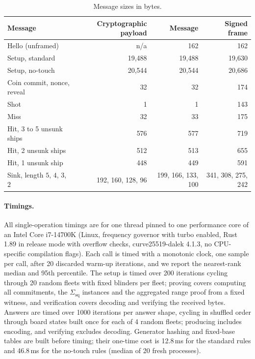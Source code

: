 \documentclass[11pt]{article}
\theoremstyle{definition}
\theoremstyle{remark}
\newcommand{\Sq}{\Sigma_{\mathrm{sq}}}
\begin{document}
\begin{table}[t]
\centering
\begin{tabular}{@{}lrrr@{}}
\toprule
Message & Cryptographic payload & Message & Signed frame\\
\midrule
Hello (unframed) & n/a & 162 & 162\\
Setup, standard & 19,488 & 19,488 & 19,630\\
Setup, no-touch & 20,544 & 20,544 & 20,686\\
Coin commit, nonce, reveal & 32 & 32 & 174\\
Shot & 1 & 1 & 143\\
Miss & 32 & 33 & 175\\
Hit, 3 to 5 unsunk ships & 576 & 577 & 719\\
Hit, 2 unsunk ships & 512 & 513 & 655\\
Hit, 1 unsunk ship & 448 & 449 & 591\\
Sink, length $5$, $4$, $3$, $2$ & 192, 160, 128, 96 & 199, 166, 133, 100 & 341, 308, 275, 242\\
\bottomrule
\end{tabular}
\caption{Message sizes in bytes.}
\label{tab:sizes}
\end{table}

\paragraph{Timings.}
All single-operation timings are for one thread pinned to one performance core of an Intel Core i7-14700K (Linux, frequency governor  with turbo enabled, Rust 1.89 in release mode with overflow checks, curve25519-dalek 4.1.3, no CPU-specific compilation flags). Each call is timed with a monotonic clock, one sample per call, after 20 discarded warm-up iterations, and we report the nearest-rank median and 95th percentile. The setup is timed over 200 iterations cycling through 20 random fleets with fixed blinders per fleet; proving covers computing all commitments, the $\Sq$ instances and the aggregated range proof from a fixed witness, and verification covers decoding and verifying the received bytes. Answers are timed over 1000 iterations per answer shape, cycling in shuffled order through board states built once for each of 4 random fleets; producing includes encoding, and verifying excludes decoding. Generator hashing and fixed-base tables are built before timing; their one-time cost is 12.8\,ms for the standard rules and 46.8\,ms for the no-touch rules (median of 20 fresh processes).
\end{document}
